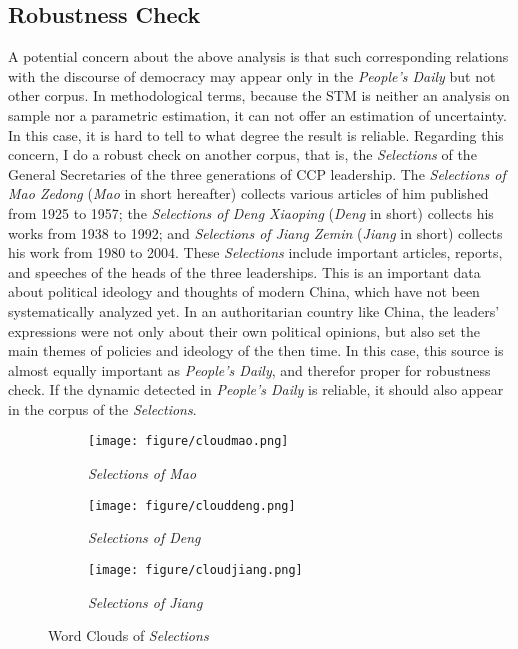 \documentclass[abstracton,UTF8]{ctexart}
\begin{document}
\subsection{Robustness Check}
A potential concern about the above analysis is that such corresponding relations with the discourse of democracy may appear only in the \textit{People's Daily} but not other corpus. In methodological terms, because the STM is neither an analysis on sample nor a parametric estimation, it can not offer an estimation of uncertainty. In this case, it is hard to tell to what degree the result is reliable. Regarding this concern, I do a robust check on another corpus, that is, the \textit{Selections} of the General Secretaries of the three generations of CCP leadership. The \textit{Selections of Mao Zedong} (\textit{Mao} in short hereafter) collects various articles of him published from 1925 to 1957; the \textit{Selections of Deng Xiaoping} (\textit{Deng} in short) collects his works from 1938 to 1992; and \textit{Selections of Jiang Zemin} (\textit{Jiang} in short) collects his work from 1980 to 2004. These \textit{Selections} include important articles, reports, and speeches of the heads of the three leaderships. This is an important data about political ideology and thoughts of modern China, which have not been systematically analyzed yet. In an authoritarian country like China, the leaders' expressions were not only about their own political opinions, but also set the main themes of policies and ideology of the then time. In this case, this source is almost equally important as \textit{People's Daily}, and therefor proper for robustness check. If the dynamic detected in \textit{People's Daily} is reliable, it should also appear in the corpus of the \textit{Selections}.

\begin{figure}[htbp]
	\begin{subfigure}{0.33\textwidth}
		\texttt{[image: figure/cloudmao.png]}
		\caption{\textit{Selections of Mao}}
		\label{f:cloudmao}
	\end{subfigure}
	\begin{subfigure}{0.33\textwidth}
		\texttt{[image: figure/clouddeng.png]}
		\caption{\textit{Selections of Deng}}
		\label{f:clouddeng}
	\end{subfigure}
	\begin{subfigure}{0.33\textwidth}
		\texttt{[image: figure/cloudjiang.png]}
		\caption{\textit{Selections of Jiang}}
		\label{f:cloudjiang}
	\end{subfigure}
	\caption{Word Clouds of \textit{Selections}}
	\label{f:cloudsele}
\end{figure}
\end{document}
